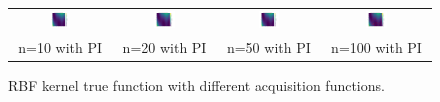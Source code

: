 \documentclass[11pt]{article}
\begin{document}
\begin{figure}[H]
\begin{tabular}{cccc}
        \includegraphics[width=0.225\textwidth]{../Task-02/plots/true_function_rbf_n10_PI.png} &
        \includegraphics[width=0.225\textwidth]{../Task-02/plots/true_function_rbf_n20_PI.png} &
        \includegraphics[width=0.225\textwidth]{../Task-02/plots/true_function_rbf_n50_PI.png} &
        \includegraphics[width=0.225\textwidth]{../Task-02/plots/true_function_rbf_n100_PI.png} \\
        n=10 with PI & n=20 with PI & n=50 with PI & n=100 with PI \\
    \end{tabular}
    \caption{RBF kernel true function with different acquisition functions.}
    \label{fig:rbf_true_function}
\end{figure}
\end{document}
